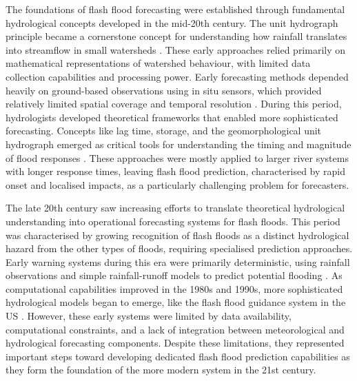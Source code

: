 The foundations of flash flood forecasting were established through fundamental hydrological concepts developed in the mid-20th century. The unit hydrograph principle became a cornerstone concept for understanding how rainfall translates into streamflow in small watersheds \citep{Rigon2016}. These early approaches relied primarily on mathematical representations of watershed behaviour, with limited data collection capabilities and processing power. Early forecasting methods depended heavily on ground-based observations using in situ sensors, which provided relatively limited spatial coverage and temporal resolution \citep{Tao2024}. During this period, hydrologists developed theoretical frameworks that enabled more sophisticated forecasting. Concepts like lag time, storage, and the geomorphological unit hydrograph emerged as critical tools for understanding the timing and magnitude of flood responses \citep{Rigon2016}. These approaches were mostly applied to larger river systems with longer response times, leaving flash flood prediction, characterised by rapid onset and localised impacts, as a particularly challenging problem for forecasters. 

The late 20th century saw increasing efforts to translate theoretical hydrological understanding into operational forecasting systems for flash floods. This period was characterised by growing recognition of flash floods as a distinct hydrological hazard from the other types of floods, requiring specialised prediction approaches. Early warning systems during this era were primarily deterministic, using rainfall observations and simple rainfall-runoff models to predict potential flooding \citep{Hapuarachchi2011}. As computational capabilities improved in the 1980s and 1990s, more sophisticated hydrological models began to emerge, like the flash flood guidance system in the US \citep{Georgakakos_1986}. However, these early systems were limited by data availability, computational constraints, and a lack of integration between meteorological and hydrological forecasting components. Despite these limitations, they represented important steps toward developing dedicated flash flood prediction capabilities as they form the foundation of the more modern system in the 21st century. 


